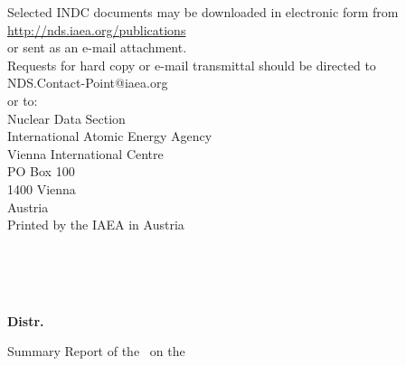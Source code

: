 {\thispagestyle{empty}
\noindent\begin{minipage}{1.0\textwidth}
  \vspace{15cm}
  \begin{center}
    Selected INDC documents may be downloaded in electronic form from\\
    \url{http://nds.iaea.org/publications}\\
    or sent as an e-mail attachment.\\
    Requests for hard copy or e-mail transmittal should be directed to\\
    NDS.Contact-Point@iaea.org\\
    or to:\\
    Nuclear Data Section\\
    International Atomic Energy Agency\\
    Vienna International Centre\\
    PO Box 100\\
    1400 Vienna\\
    Austria\\
    \bigskip
    \bigskip
    Printed by the IAEA in Austria\\
    \bigskip
    \reportdate \\
  \end{center}
\end{minipage}
\newpage


\thispagestyle{empty}
\noindent\begin{minipage}{.6\textwidth}
 ~ \\
\end{minipage}%
\begin{minipage}{.4\textwidth}
  {\normalfont\sffamily\bfseries\flushright\fontsize{12pt}{0pt}\selectfont
  \reportnumber \\
  Distr. \reportdistribution\\}
\end{minipage}

\begin{center}
  {\normalfont\sffamily\fontsize{14pt}{40pt}\selectfont
    Summary Report of the \meetingtype\ on the\\
  }

  {\normalfont\sffamily\bfseries\fontsize{16pt}{36pt}\selectfont
    \meetingsubject \\
  }

  {\normalfont\sffamily\fontsize{12pt}{24pt}\selectfont
    \meetinglocation \\
    \meetingdate \\
  }
\bigskip
  {\normalfont\sffamily\fontsize{20pt}{10pt}
    \bigskip
    \medskip
    \reportpreparer
  }
\end{center}
\vfill
\bigskip
\begin{abstract}

\end{abstract}
\bigskip
\begin{center}
\reportdate
\end{center}
\newpage

}
